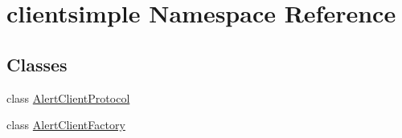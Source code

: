 \hypertarget{namespaceclientsimple}{\section{clientsimple Namespace Reference}
\label{namespaceclientsimple}
}
\subsection*{Classes}
\begin{DoxyCompactItemize}
\item 
class \hyperlink{classclientsimple_1_1_alert_client_protocol}{Alert\-Client\-Protocol}
\item 
class \hyperlink{classclientsimple_1_1_alert_client_factory}{Alert\-Client\-Factory}
\end{DoxyCompactItemize}
